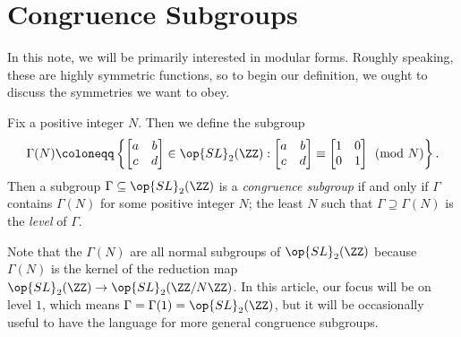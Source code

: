 \documentclass{amsart}
\begin{document}
\section{Congruence Subgroups}
In this note, we will be primarily interested in modular forms. Roughly speaking, these are highly symmetric functions, so to begin our definition, we ought to discuss the symmetries we want to obey.
\begin{definition}
	Fix a positive integer $N$. Then we define the subgroup
	\[\Gamma(N)\coloneqq\left\{\begin{bmatrix}
		a & b \\
		c & d
	\end{bmatrix}\in\op{SL}_2(\ZZ):\begin{bmatrix}
		a & b \\
		c & d
	\end{bmatrix}\equiv\begin{bmatrix}
		1 & 0 \\
		0 & 1
	\end{bmatrix}\pmod N\right\}.\]
	Then a subgroup $\Gamma\subseteq\op{SL}_2(\ZZ)$ is a \textit{congruence subgroup} if and only if $\Gamma$ contains $\Gamma(N)$ for some positive integer $N$; the least $N$ such that $\Gamma\supseteq\Gamma(N)$ is the \textit{level} of $\Gamma$.
\end{definition}
Note that the $\Gamma(N)$ are all normal subgroups of $\op{SL}_2(\ZZ)$ because $\Gamma(N)$ is the kernel of the reduction map $\op{SL}_2(\ZZ)\to\op{SL}_2(\ZZ/N\ZZ)$. In this article, our focus will be on level $1$, which means $\Gamma=\Gamma(1)=\op{SL}_2(\ZZ)$, but it will be occasionally useful to have the language for more general congruence subgroups.
\end{document}
